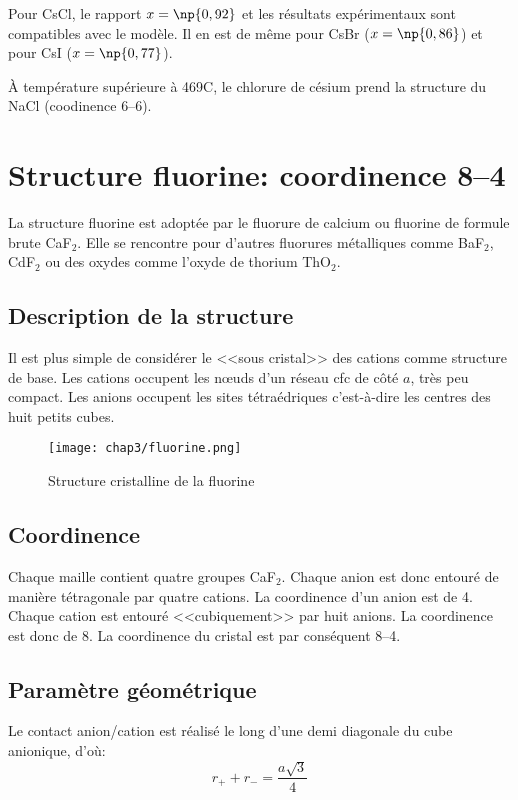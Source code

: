 \begin{rem}
    Pour CsCl, le rapport $x = \np{0,92}$ et les résultats 
    expérimentaux sont 
    compatibles avec le modèle. Il en est de même pour CsBr
    ($x = \np{0,86}$) et pour CsI ($x = \np{0,77}$).
\end{rem}
\begin{rem}
    \`A température supérieure à 469\degre C, le chlorure de césium
    prend la structure du NaCl (coodinence 6\---6).
\end{rem}



\section{Structure fluorine: coordinence 8\---4}
La structure fluorine est adoptée par le fluorure de calcium ou fluorine de formule
brute CaF$_2$. Elle se rencontre pour d'autres fluorures métalliques comme
BaF$_2$, CdF$_2$ ou des oxydes comme l'oxyde de 
thorium ThO$_2$.


\subsection{Description de la structure}
Il est plus simple de considérer le <<sous cristal>> des cations comme structure de base.
Les cations occupent les n\oe uds d'un réseau cfc de côté $a$, très peu compact. Les anions
occupent les sites tétraédriques c'est-à-dire les centres des huit petits cubes.
\begin{figure}
    \centering
    \texttt{[image: chap3/fluorine.png]}
    \caption{Structure cristalline de la fluorine}\label{fig:3_fluorine}
\end{figure}


\subsection{Coordinence}
Chaque maille contient quatre groupes CaF$_2$. Chaque anion est donc entouré de
manière tétragonale par quatre cations. La coordinence d'un anion est de 4.
Chaque cation est entouré <<cubiquement>> par huit anions. La coordinence est donc
de 8. La coordinence du cristal est par conséquent 8\---4.


\subsection{Paramètre géométrique}
Le contact anion/cation est réalisé le long d'une demi diagonale du cube anionique,
d'où:
\begin{equation}
    r_+ + r_- = \frac{a\sqrt{3}}{4}
    \label{eq:3_caf2_r+r-a}
\end{equation}


